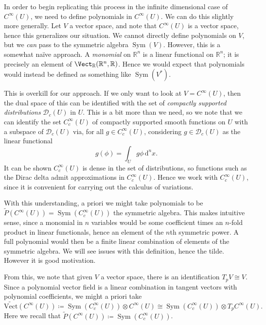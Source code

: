 In order to begin replicating this process in the infinite dimensional case of $C^\infty (U)$, we need to define polynomials in $C^\infty (U)$. We can do this slightly more generally. Let $V$ a vector space, and note that $C^\infty (U)$ is a vector space, hence this generalizes our situation. We cannot directly define polynomials on $V$, but we \emph{can} pass to the symmetric algebra $\operatorname{Sym} (V)$. However, this is a somewhat na\"ive approach. A \emph{monomial} on $\mathbb{R} ^n$ is a linear functional on $\mathbb{R}^n$; it is precisely an element of $\Vect_{\mathbb{R} } (\mathbb{R} ^n,\mathbb{R} )$. Hence we would expect that polynomials would instead be defined as something like $\operatorname{Sym} (V^*)$.

This is overkill for our approach. If we only want to look at $V=C^\infty (U)$, then the dual space of this can be identified with the set of \emph{compactly supported distributions} $\mathcal{D}_c (U)$ in $U$. This is a bit more than we need, so we note that we can identify the set $C_c^\infty (U)$ of compactly supported smooth functions on $U$ with a subspace of $\mathcal{D} _c(U)$ via, for all $g\in C^\infty _c(U)$, considering $g\in \mathcal{D} _c(U)$ as the linear functional
\[
	g(\phi )=\int_U g\phi  \,\mathrm{d} ^nx
.\]
It can be shown $C^\infty _c(U)$ is dense in the set of distributions, so functions such as the Dirac delta admit approximations in $C^\infty _c(U)$. Hence we work with $C^\infty _c(U)$, since it is convenient for carrying out the calculus of variations.

With this understanding, a priori we might take polynomials to be $\widetilde{P} (C^\infty (U))=\operatorname{Sym} (C_c^\infty (U))$ the symmetric algebra. This makes intuitive sense, since a monomial in $n$ variables would be some coefficient times an $n$-fold product in linear functionals, hence an element of the $n$th symmetric power. A full polynomial would then be a finite linear combination of elements of the symmetric algebra. We will see issues with this definition, hence the tilde. However it is good motivation.

From this, we note that given $V$ a vector space, there is an identification $T_pV \cong V$. Since a polynomial vector field is a linear combination in tangent vectors with polynomial coefficients, we might a priori take
\[
	\widetilde{\mathrm{Vect} } (C^\infty (U))\coloneqq \operatorname{Sym} (C^\infty _c(U))\otimes C^\infty (U) \cong \operatorname{Sym} (C^\infty _c(U))\otimes T_pC^\infty (U)
.\]
Here we recall that $\widetilde{P}(C^\infty (U))\coloneqq \operatorname{Sym} (C^\infty _c(U))$.

